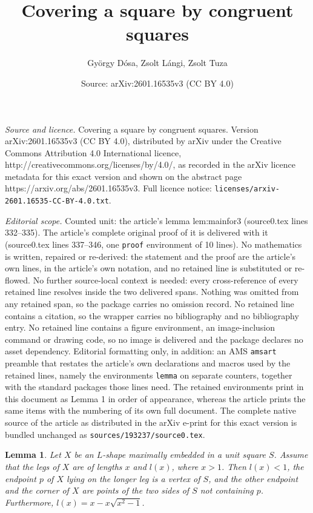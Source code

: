\documentclass[10pt,a4paper]{amsart}
\title{Covering a square by congruent squares}
\author{Gy\"orgy D\'osa, Zsolt L\'angi, Zsolt Tuza}
\date{Source: arXiv:2601.16535v3 (CC BY 4.0)}
\newtheorem{lemma}{Lemma}
\begin{document}
\maketitle

\noindent\emph{Source and licence.} Covering a square by congruent squares. Version arXiv:2601.16535v3 (CC BY 4.0), distributed by arXiv under the Creative Commons Attribution 4.0 International licence, http://creativecommons.org/licenses/by/4.0/, as recorded in the arXiv licence metadata for this exact version and shown on the abstract page https://arxiv.org/abs/2601.16535v3. Full licence notice: \texttt{licenses/arxiv-2601.16535-CC-BY-4.0.txt}.\par\smallskip

\noindent\textit{Editorial scope.} Counted unit: the article's lemma lem:mainfor3 (source0.tex lines 332--335). The article's complete original proof of it is delivered with it (source0.tex lines 337--346, one \texttt{proof} environment of 10 lines). No mathematics is written, repaired or re-derived: the statement and the proof are the article's own lines, in the article's own notation, and no retained line is substituted or re-flowed.  No further source-local context is needed: every cross-reference of every retained line resolves inside the two delivered spans.  Nothing was omitted from any retained span, so the package carries no omission record.  No retained line contains a citation, so the wrapper carries no bibliography and no bibliography entry.  No retained line contains a figure environment, an image-inclusion command or drawing code, so no image is delivered and the package declares no asset dependency.  Editorial formatting only, in addition: an AMS \texttt{amsart} preamble that restates the article's own declarations and macros used by the retained lines, namely the environments \texttt{lemma} on separate counters, together with the standard packages those lines need.  The retained environments print in this document as Lemma 1 in order of appearance, whereas the article prints the same items with the numbering of its own full document.  The complete native source of the article as distributed in the arXiv e-print for this exact version is bundled unchanged as \texttt{sources/193237/source0.tex}.
\begin{lemma}\label{lem:mainfor3}
Let $X$ be an $L$-shape maximally embedded in a unit square $S$. Assume that the legs of $X$ are of lengths $x$ and $l(x)$, where $x > 1$. Then $l(x) < 1$, the endpoint $p$ of $X$ lying on the longer leg is a vertex of $S$, and the other endpoint and the corner of $X$ are points of the two sides of $S$ not containing $p$.
Furthermore, $l(x)=x-x\sqrt{x^2-1}$.
\end{lemma}
\end{document}
